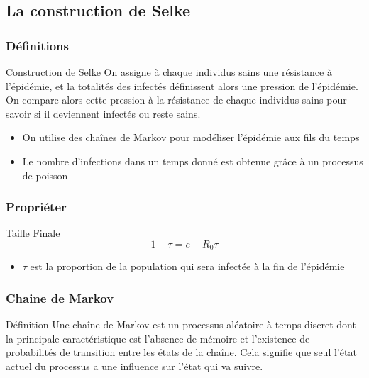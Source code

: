 \subsection{La construction de Selke}

\begin{frame}
    \frametitle{Définitions}

    \begin{block}{Construction de Selke}
        On assigne à chaque individus sains une résistance à l'épidémie, et la totalités des infectés définissent alors une pression de l'épidémie. On compare alors cette pression à la résistance de chaque individus sains pour savoir si il deviennent infectés ou reste sains.
    \end{block}

    \begin{itemize}
        \item On utilise des chaînes de Markov pour modéliser l'épidémie aux fils du temps
        \item Le nombre d'infections dans un temps donné est obtenue grâce à un processus de poisson
    \end{itemize}
\end{frame}

\begin{frame}
    \frametitle{Propriéter}

    \begin{block}{Taille Finale}
        $$ 1 - \tau = e - R_0\tau $$
    \end{block}

    \begin{itemize}
        \item $\tau$ est la proportion de la population qui sera infectée à la fin de l’épidémie
    \end{itemize}
\end{frame}


\begin{frame}
    \frametitle{Chaine de Markov}

    \begin{block}{Définition}
        Une chaîne de Markov est un processus aléatoire à temps discret dont la principale caractéristique est l’absence de mémoire et l’existence de probabilités de transition entre les états de la chaîne. Cela signifie que seul l’état actuel du processus a une influence sur l’état qui va suivre.
    \end{block}


\end{frame}

